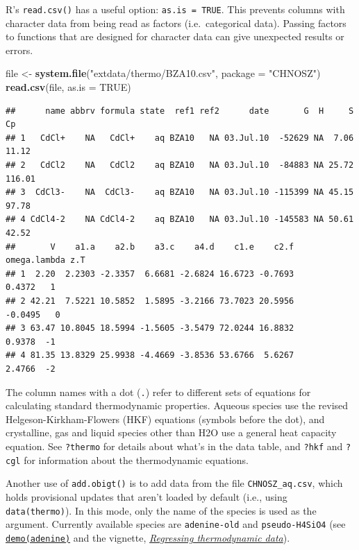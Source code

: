 \documentclass[]{tufte-handout}
\newenvironment{Shaded}{}{}
\newcommand{\KeywordTok}[1]{\textcolor[rgb]{0.00,0.44,0.13}{\textbf{#1}}}
\newcommand{\DataTypeTok}[1]{\textcolor[rgb]{0.56,0.13,0.00}{#1}}
\newcommand{\StringTok}[1]{\textcolor[rgb]{0.25,0.44,0.63}{#1}}
\newcommand{\OtherTok}[1]{\textcolor[rgb]{0.00,0.44,0.13}{#1}}
\newcommand{\NormalTok}[1]{#1}
\begin{document}
\begin{marginfigure}
R's \texttt{read.csv()} has a useful option: \texttt{as.is\ =\ TRUE}.
This prevents columns with character data from being read as factors
(i.e.~categorical data). Passing factors to functions that are designed
for character data can give unexpected results or errors.
\end{marginfigure}

\begin{Shaded}
\begin{Highlighting}[]
\NormalTok{file <-}\StringTok{ }\KeywordTok{system.file}\NormalTok{(}\StringTok{"extdata/thermo/BZA10.csv"}\NormalTok{, }\DataTypeTok{package =} \StringTok{"CHNOSZ"}\NormalTok{)}
\KeywordTok{read.csv}\NormalTok{(file, }\DataTypeTok{as.is =} \OtherTok{TRUE}\NormalTok{)}
\end{Highlighting}
\end{Shaded}

\begin{verbatim}
##      name abbrv formula state  ref1 ref2      date       G  H     S     Cp
## 1   CdCl+    NA   CdCl+    aq BZA10   NA 03.Jul.10  -52629 NA  7.06  11.12
## 2   CdCl2    NA   CdCl2    aq BZA10   NA 03.Jul.10  -84883 NA 25.72 116.01
## 3  CdCl3-    NA  CdCl3-    aq BZA10   NA 03.Jul.10 -115399 NA 45.15  97.78
## 4 CdCl4-2    NA CdCl4-2    aq BZA10   NA 03.Jul.10 -145583 NA 50.61  42.52
##       V    a1.a    a2.b    a3.c    a4.d    c1.e    c2.f omega.lambda z.T
## 1  2.20  2.2303 -2.3357  6.6681 -2.6824 16.6723 -0.7693       0.4372   1
## 2 42.21  7.5221 10.5852  1.5895 -3.2166 73.7023 20.5956      -0.0495   0
## 3 63.47 10.8045 18.5994 -1.5605 -3.5479 72.0244 16.8832       0.9378  -1
## 4 81.35 13.8329 25.9938 -4.4669 -3.8536 53.6766  5.6267       2.4766  -2
\end{verbatim}

The column names with a dot (\texttt{.}) refer to different sets of
equations for calculating standard thermodynamic properties. Aqueous
species use the revised Helgeson-Kirkham-Flowers (HKF) equations
(symbols before the dot), and crystalline, gas and liquid species other
than H2O use a general heat capacity equation. See {\texttt{?thermo}}
for details about what's in the data table, and {\texttt{?hkf}} and
{\texttt{?cgl}} for information about the thermodynamic equations.

Another use of {\texttt{add.obigt()}} is to add data from the file
\texttt{CHNOSZ\_aq.csv}, which holds provisional updates that aren't
loaded by default (i.e., using {\texttt{data(thermo)}}). In this mode,
only the name of the species is used as the argument. Currently
available species are \texttt{adenine-old} and \texttt{pseudo-H4SiO4}
(see \href{../demo}{{\texttt{demo(adenine)}}} and the vignette,
\href{eos-regress.html}{{\emph{Regressing thermodynamic data}}}).
\end{document}
